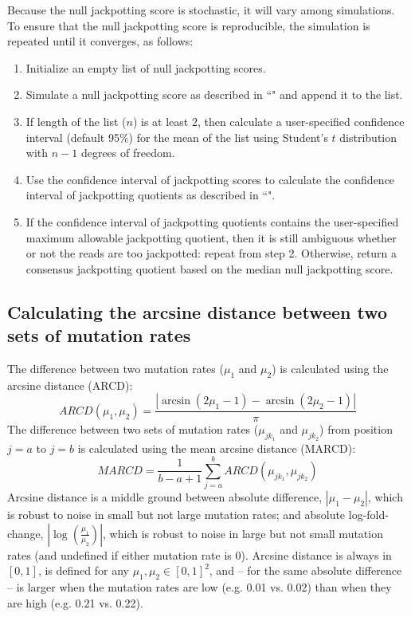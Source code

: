 \documentclass[11pt]{article}
\begin{document}
Because the null jackpotting score is stochastic, it will vary among simulations.
To ensure that the null jackpotting score is reproducible, the simulation is repeated until it converges, as follows:
\begin{enumerate}
    \item Initialize an empty list of null jackpotting scores.
    \item Simulate a null jackpotting score as described in ``" and append it to the list.
    \item If length of the list ($n$) is at least 2, then calculate a user-specified confidence interval (default 95\%) for the mean of the list using Student's $t$ distribution with $n - 1$ degrees of freedom.
    \item Use the confidence interval of jackpotting scores to calculate the confidence interval of jackpotting quotients as described in ``".
    \item If the confidence interval of jackpotting quotients contains the user-specified maximum allowable jackpotting quotient, then it is still ambiguous whether or not the reads are too jackpotted: repeat from step 2. Otherwise, return a consensus jackpotting quotient based on the median null jackpotting score.
\end{enumerate}


\subsection{Calculating the arcsine distance between two sets of mutation rates}
\label{calc-arcsine-distance}

The difference between two mutation rates ($\mu_1$ and $\mu_2$) is calculated using the arcsine distance (ARCD):
$$ARCD(\mu_1, \mu_2) = \frac{|\arcsin{(2\mu_1 - 1)} - \arcsin{(2\mu_2 - 1)}|}{\pi}$$
The difference between two sets of mutation rates ($\mu_{jk_1}$ and $\mu_{jk_2}$) from position $j = a$ to $j = b$ is calculated using the mean arcsine distance (MARCD):
$$MARCD = \frac{1}{b - a + 1}\sum_{j=a}^b{ARCD(\mu_{jk_1}, \mu_{jk_2})}$$
Arcsine distance is a middle ground between absolute difference, $|\mu_1 - \mu_2|$, which is robust to noise in small but not large mutation rates; and absolute log-fold-change, $|\log{(\frac{\mu_1}{\mu_2})}|$, which is robust to noise in large but not small mutation rates (and undefined if either mutation rate is 0). Arcsine distance is always in $[0, 1]$, is defined for any $\mu_1, \mu_2 \in [0, 1]^2$, and -- for the same absolute difference -- is larger when the mutation rates are low (e.g. 0.01 vs. 0.02) than when they are high (e.g. 0.21 vs. 0.22).
\end{document}
